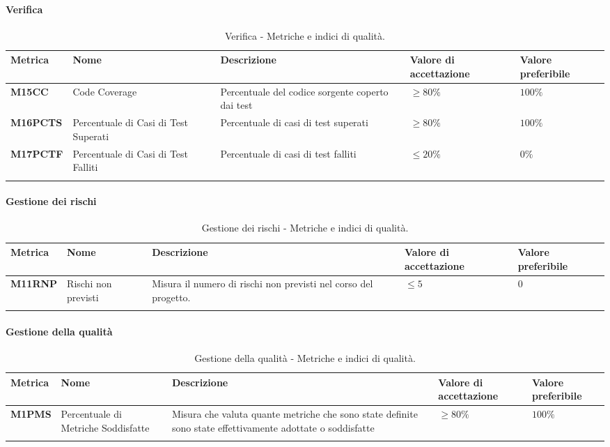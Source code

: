 \paragraph{Verifica}
\hspace{1pt}
\begin{longtable}{|C{1.5cm}|L{3cm}|L{4cm}|L{2.5cm}|L{2.5cm}|}
    \hline
    \textbf{Metrica} & \textbf{Nome} & \textbf{Descrizione} & \textbf{Valore di accettazione} & \textbf{Valore preferibile} \\
    \hline
    \textbf{M15CC} & Code Coverage & Percentuale del codice sorgente coperto dai test & $\geq 80\%$ & $100\%$ \\
    \hline
    \textbf{M16PCTS} & Percentuale di Casi di Test Superati & Percentuale di casi di test superati & $\geq 80\%$ & $100\%$ \\
    \hline
    \textbf{M17PCTF} & Percentuale di Casi di Test Falliti & Percentuale di casi di test falliti & $\leq 20\%$ & $0\%$ \\
    \hline
\caption{Verifica - Metriche e indici di qualità.}
\label{tab:metriche_testo}
\end{longtable}


\paragraph{Gestione dei rischi}
\hspace{1pt}
    \begin{longtable}{|C{1.5cm}|L{3cm}|L{4cm}|L{2.5cm}|L{2.5cm}|}
        \hline
      \textbf{Metrica} & \textbf{Nome} & \textbf{Descrizione} & \textbf{Valore di accettazione} & \textbf{Valore preferibile} \\
      \hline
      \textbf{M11RNP}    & Rischi non previsti   & Misura il numero di rischi non previsti nel corso del progetto. & $\leq 5$ &   $0$ \\
      \hline
    \caption{Gestione dei rischi - Metriche e indici di qualità.}
    \label{tab:tabella2}
\end{longtable}


\paragraph{Gestione della qualità}
\hspace{1pt}
    \begin{longtable}{|C{1.5cm}|L{3cm}|L{4cm}|L{2.5cm}|L{2.5cm}|}
        \hline
        \textbf{Metrica} & \textbf{Nome} & \textbf{Descrizione} & \textbf{Valore di accettazione} & \textbf{Valore preferibile} \\
        \hline
        \textbf{M1PMS} & Percentuale di Metriche Soddisfatte & Misura che valuta quante metriche che sono state definite sono state effettivamente adottate o soddisfatte & $\geq 80\%$ & $100\%$ \\
        \hline
    \caption{Gestione della qualità - Metriche e indici di qualità.}
    \label{tab:gestione_metriche_testo}
\end{longtable}



